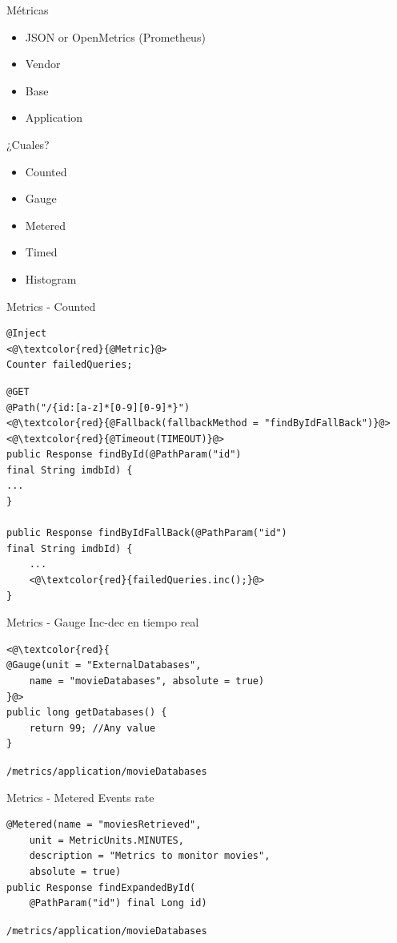 \documentclass[aspectratio=169]{beamer}
\begin{document}
\begin{frame}{Métricas}

\begin{itemize}
	\item JSON or OpenMetrics (Prometheus)
	\item Vendor
	\item Base
	\item Application
\end{itemize}

¿Cuales?
\begin{itemize}
	\item Counted
	\item Gauge
	\item Metered
	\item Timed
	\item Histogram
\end{itemize}

\end{frame}

\begin{frame}[fragile]{Metrics - Counted}
\begin{lstlisting}
@Inject
<@\textcolor{red}{@Metric}@>
Counter failedQueries;
\end{lstlisting}

\begin{lstlisting}
@GET
@Path("/{id:[a-z]*[0-9][0-9]*}")
<@\textcolor{red}{@Fallback(fallbackMethod = "findByIdFallBack")}@>
<@\textcolor{red}{@Timeout(TIMEOUT)}@>
public Response findById(@PathParam("id")
final String imdbId) {
...
}

public Response findByIdFallBack(@PathParam("id")
final String imdbId) {
    ...
    <@\textcolor{red}{failedQueries.inc();}@>
}
\end{lstlisting}
\end{frame}

\begin{frame}[fragile]{Metrics - Gauge}
Inc-dec en tiempo real
\begin{lstlisting}
<@\textcolor{red}{
@Gauge(unit = "ExternalDatabases",
    name = "movieDatabases", absolute = true)
}@>
public long getDatabases() {
    return 99; //Any value
}
\end{lstlisting}

\lstinline|/metrics/application/movieDatabases|
\end{frame}

\begin{frame}[fragile]{Metrics - Metered}
Events rate
\begin{lstlisting}
@Metered(name = "moviesRetrieved",
    unit = MetricUnits.MINUTES,
    description = "Metrics to monitor movies",
    absolute = true)
public Response findExpandedById(
    @PathParam("id") final Long id)
\end{lstlisting}

\lstinline|/metrics/application/movieDatabases|
\end{frame}
\end{document}
